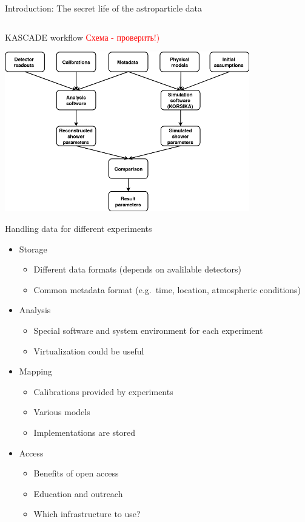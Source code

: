 \documentclass[18pt]{beamer}
\begin{document}
\begin{frame}{Introduction: The secret life of the astroparticle data}
\begin{columns}
\begin{column}[t]{0.49\textwidth}
  \end{column}

\end{columns}
\end{frame}

\begin{frame}{KASCADE workflow}
\textcolor{red}{Схема - проверить!)}
\begin{center}
\includegraphics[width=0.8\textwidth]{pics/KCDC_workflow.png}
\end{center}
\end{frame}

\begin{frame}{Handling data for different experiments}
\begin{itemize}
  \item Storage
  \begin{itemize}
    \item Different data formats (depends on avalilable detectors)
    \item Common metadata format (e.g.\ time, location, atmospheric conditions)
  \end{itemize}
  \item Analysis
  \begin{itemize}
    \item Special software and system environment for each experiment
    \item Virtualization could be useful
  \end{itemize}
  \item Mapping
  \begin{itemize}
    \item Calibrations provided by experiments
    \item Various models
    \item Implementations are stored
  \end{itemize}
  \item Access
  \begin{itemize}
    \item Benefits of open access
    \item Education and outreach
    \item Which infrastructure to use?
  \end{itemize}
\end{itemize}
\end{frame}
\end{document}
